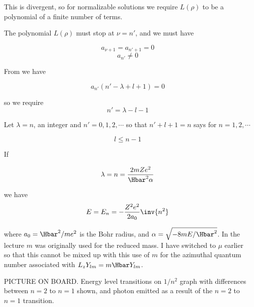 This is divergent, so for normalizable solutions we require $L(\rho)$ to be a polynomial of a finite number of terms.

The polynomial $L(\rho)$ must stop at $\nu = n'$, and we must have

\begin{equation}\label{eqn:PHY356FLecture10:260}
a_{\nu+1} = a_{n' +1} = 0
\end{equation}
\begin{equation}\label{eqn:PHY356FLecture10:270}
a_{n'} \ne 0
\end{equation}

From  we have

\begin{equation}\label{eqn:PHY356FLecture10:200a}
a_{n'} \left(
n' - \lambda + l + 1
\right)
=0
\end{equation}

so we require
\begin{equation}\label{eqn:PHY356FLecture10:280}
n' = \lambda - l - 1
\end{equation}

Let $\lambda = n$, an integer and $n' = 0, 1, 2, \cdots$ so that $n' + l + 1 = n$ says for $n= 1,2, \cdots$

\begin{equation}\label{eqn:PHY356FLecture10:290}
l \le n-1
\end{equation}

If

\begin{equation}\label{eqn:PHY356FLecture10:300}
\lambda = n = \frac{2 m Z e^2 }{\Hbar^2 \alpha}
\end{equation}

we have
\begin{equation}\label{eqn:PHY356FLecture10:310}
E = E_n = - \frac{Z^2 e^2 }{2 a_0} \inv{n^2}
\end{equation}

where $a_0 = \Hbar^2/m e^2$ is the Bohr radius, and $\alpha = \sqrt{-8 m E/\Hbar^2}$.  In the lecture $m$ was originally used for the reduced mass.  I have switched to $\mu$ earlier so that this cannot be mixed up with this use of $m$ for the azimuthal quantum number associated with $L_z Y_{lm} = m \Hbar Y_{lm}$.

PICTURE ON BOARD.  Energy level transitions on $1/n^2$ graph with differences between $n=2$ to $n=1$ shown, and photon emitted as a result of the $n=2$ to $n=1$ transition.

